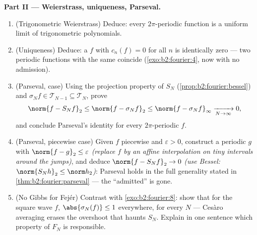 \begin{problem}
\medskip
\noindent\textbf{Part II --- Weierstrass, uniqueness,
Parseval.}
\begin{enumerate}[resume]
  \item (Trigonometric Weierstrass) Deduce: every 
        $2\pi$-periodic function is a uniform limit of
        trigonometric polynomials.
  \item (Uniqueness) Deduce: a  $f$ with $c_n(f) = 0$
        for all $n$ is identically zero --- two 
        periodic functions with the same 
        coincide (\cref{exo:b2:fourier:4}, now with no
        admission).
  \item (Parseval,  case) Using the projection
        property of $S_N$ (\cref{prop:b2:fourier:bessel}) and
        $\sigma_Nf \in \mathcal T_{N-1} \subseteq \mathcal
        T_N$, prove
        \[
        \norm{f - S_Nf}_2 \leq \norm{f - \sigma_Nf}_2
        \leq \norm{f - \sigma_Nf}_\infty
        \xrightarrow[N\to\infty]{} 0 ,
        \]
        and conclude Parseval's identity for every
        \emph{} $2\pi$-periodic $f$.
  \item (Parseval, piecewise  case) Given $f$
        piecewise  and $\varepsilon > 0$, construct a
         periodic $g$ with $\norm{f - g}_2 \leq
        \varepsilon$ \emph{(replace $f$ by an affine
        interpolation on tiny intervals around the jumps)},
        and deduce $\norm{f - S_Nf}_2 \to 0$
        \emph{(use Bessel: $\norm{S_Nh}_2 \leq \norm h_2$)}:
        Parseval holds in the full generality stated in
        \cref{thm:b2:fourier:parseval} --- the ``admitted''
        is gone.
  \item (No Gibbs for Fej\'er) Contrast with
        \cref{exo:b2:fourier:8}: show that for the square wave
        $f$, $\abs{\sigma_N(f)} \leq 1$ everywhere, for every
        $N$ --- Ces\`aro averaging erases the overshoot that
        haunts $S_N$. Explain in one sentence which property
        of $F_N$ is responsible.
\end{enumerate}


\end{problem}
